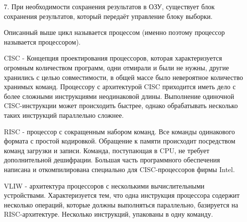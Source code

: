 \documentclass{article}
\begin{document}
7. При необходимости сохранения результатов в ОЗУ, существует блок сохранения результатов, который передаёт управление блоку выборки.

Описанный выше цикл называется процессом (именно поэтому процессор называется процессором). 


CISC - Концепция проектирования процессоров, которая характеризуется огромным количеством программ, одни отмирали и были не нужны, другие хранились с целью совместимости, в общей массе было невероятное количество хранимых команд. 
Процессору с архитектурой CISC приходится иметь дело с более сложными инструкциями неодинаковой длины. 
Выполнение одиночной CISC-инструкции может происходить быстрее, однако обрабатывать несколько таких инструкций параллельно сложнее.


RISC - процессор с сокращенным набором команд.
Все команды одинакового формата с простой кодировкой. Обращение к памяти происходит посредством команд загрузки и записи. 
Команда, поступающая в CPU, не требует дополнительной дешифрации. Большая часть программного обеспечения написана и откомпилирована специально для CISC-процессоров фирмы Intel.

VLIW - архитектура процессоров с несколькими вычислительными устройствами. 
Характеризуется тем, что одна инструкция процессора содержит несколько операций, которые должны выполняться параллельно, 
базируется на RISC-архитектуре. Несколько инструкций, упакованы в одну команду. 
\end{document}
